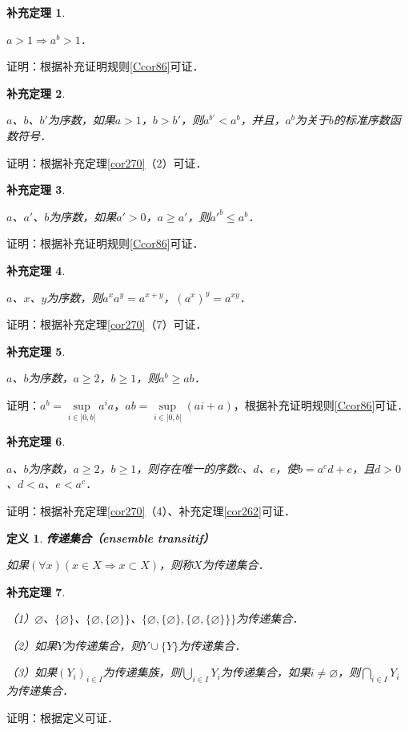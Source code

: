 \documentclass[12pt, a4paper, oneside]{book}
\newtheorem{cor}{补充定理}
\newtheorem{de}{定义}
\begin{document}
			\begin{cor}\label{cor271}
				\hfill\par
				$a>1\Rightarrow a^b>1$．
			\end{cor}
			证明：根据补充证明规则\ref{Ccor86}可证．
						
			\begin{cor}\label{cor272}
				\hfill\par
				$a$、$b$、$b'$为序数，如果$a>1$，$b>b'$，则$a^{b'}<a^b$，并且，$a^b$为关于$b$的标准序数函数符号．
			\end{cor}
			证明：根据补充定理\ref{cor270}（2）可证．
						
			\begin{cor}\label{cor273}
				\hfill\par
				$a$、$a'$、$b$为序数，如果$a'>0$，$a\geq a'$，则${a'}^b\leq a^b$．
			\end{cor}
			证明：根据补充证明规则\ref{Ccor86}可证．
			
			\begin{cor}\label{cor274}
				\hfill\par
				$a$、$x$、$y$为序数，则$a^xa^y=a^{x+y}$，$(a^x)^y=a^{xy}$．
			\end{cor}
			证明：根据补充定理\ref{cor270}（7）可证．
			
			\begin{cor}\label{cor275}
				\hfill\par
				$a$、$b$为序数，$a\geq 2$，$b\geq 1$，则$a^b\geq ab$．
			\end{cor}
			证明：$a^b=\mathop{sup}\limits_{i\in ]0, b[}a^ia$，$ab=\mathop{sup}\limits_{i\in ]0, b[}(ai+a)$，根据补充证明规则\ref{Ccor86}可证．
			
			\begin{cor}\label{cor276}
				\hfill\par
				$a$、$b$为序数，$a\geq 2$，$b\geq 1$，则存在唯一的序数$c$、$d$、$e$，使$b=a^cd+e$，且$d>0$、$d<a$、$e<a^c$．
			\end{cor}
			证明：根据补充定理\ref{cor270}（4）、补充定理\ref{cor262}可证．
												
			\begin{de}
				\textbf{传递集合（ensemble transitif）}
				\par
				如果$(\forall x)(x\in X\Rightarrow x\subset X)$，则称$X$为传递集合．
			\end{de}
			
			\begin{cor}\label{cor277}
				\hfill\par
				（1）$\varnothing$、$\{\varnothing\}$、$\{\varnothing, \{\varnothing\}\}$、$\{\varnothing, \{\varnothing\}, \{\varnothing, \{\varnothing\}\}\}$为传递集合．
				\par
				（2）如果$Y$为传递集合，则$Y\cup\{Y\}$为传递集合．
				\par
				（3）如果$(Y_i)_{i\in I}$为传递集族，则$\bigcup\limits_{i\in I}Y_i$为传递集合，如果$i\neq \varnothing$，则$\bigcap\limits_{i\in I}Y_i$为传递集合．
			\end{cor}
			证明：根据定义可证．
												
\end{document}
